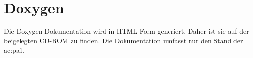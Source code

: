 %
%
\chapter{Doxygen}\label{ch:doxygen}
	Die Doxygen-Dokumentation wird in \textsf{HTML}-Form generiert. Daher ist sie auf der beigelegten CD-ROM zu finden. Die Dokumentation umfasst nur den Stand der \gls{ac:pa1}. 
%	
%	
%	
